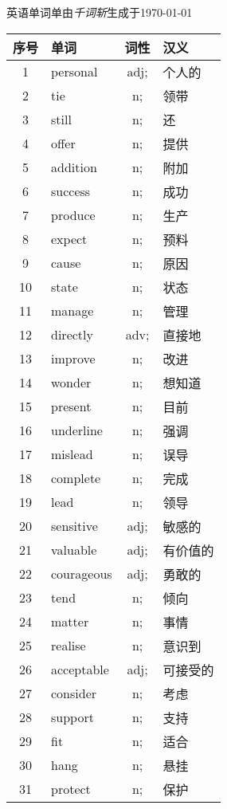 \documentclass[UTF-8]{article}
\begin{document}
	\textsf{英语单词单}由\textit{千词斩}生成于\today
	\begin{longtable}{c|p{6cm}|c|p{6cm}}
		序号 & 单词 & 词性 & 汉义\\
\hline        1& personal& adj;& 个人的 \\
\hline        2& tie& n;& 领带 \\
\hline        3& still& n;& 还 \\
\hline        4& offer& n;& 提供 \\
\hline        5& addition& n;& 附加 \\
\hline        6& success& n;& 成功 \\
\hline        7& produce& n;& 生产 \\
\hline        8& expect& n;& 预料 \\
\hline        9& cause& n;& 原因 \\
\hline        10& state& n;& 状态 \\
\hline        11& manage& n;& 管理 \\
\hline        12& directly& adv;& 直接地 \\
\hline        13& improve& n;& 改进 \\
\hline        14& wonder& n;& 想知道 \\
\hline        15& present& n;& 目前 \\
\hline        16& underline& n;& 强调 \\
\hline        17& mislead& n;& 误导 \\
\hline        18& complete& n;& 完成 \\
\hline        19& lead& n;& 领导 \\
\hline        20& sensitive& adj;& 敏感的 \\
\hline        21& valuable& adj;& 有价值的 \\
\hline        22& courageous& adj;& 勇敢的 \\
\hline        23& tend& n;& 倾向 \\
\hline        24& matter& n;& 事情 \\
\hline        25& realise& n;& 意识到 \\
\hline        26& acceptable& adj;& 可接受的 \\
\hline        27& consider& n;& 考虑 \\
\hline        28& support& n;& 支持 \\
\hline        29& fit& n;& 适合 \\
\hline        30& hang& n;& 悬挂 \\
\hline        31& protect& n;& 保护 \\

\end{longtable}
\end{document}
